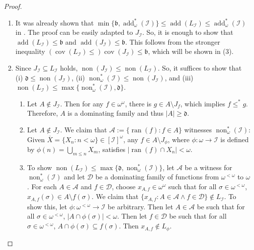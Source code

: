 \documentclass[a4paper,12pt]{amsart}
\theoremstyle{definition}
\numberwithin{thm}{section}
\numberwithin{equation}{section}
\newcommand{\bb}{\mathfrak{b}}
\newcommand{\dd}{\mathfrak{d}}
\DeclareMathOperator{\non}{non}
\DeclareMathOperator{\cov}{cov}
\DeclareMathOperator{\add}{add}
\DeclareMathOperator{\ran}{ran}
\newcommand{\I}{\mathscr{I}}
\renewcommand{\subset}{\subseteq}
\begin{document}
    \begin{proof}
        \begin{enumerate}
        \item It was already shown that $\min\{\bb, \add^*_\omega(\I)\}\leq\add(L_\I)\leq\add^*_\omega(\I)$ in \cite[Proposition 3.6 and Theorem 4.2]{CM25}. The proof can be easily adapted to $J_\I$. So, it is enough to show that $\add(L_\I)\leq\bb$ and $\add(J_\I)\leq\bb$. This follows from the stronger inequality $(\cov(L_\I)\leq)\cov(J_\I)\leq\bb$, which will be shown in (3).
        \item Since $J_\I \subset L_\I$ holds, $\non(J_\I)\leq\non(L_\I)$. So, it suffices to show that (i) $\dd\leq\non(J_\I)$, (ii) $\non^*_\omega(\I)\leq\non(J_\I)$, and (iii) $\non(L_\I)\leq\max\{\non^*_\omega(\I), \dd\}$.
        \begin{enumerate}[label = (\roman*)]
            \item Let $A \notin J_\I$. Then for any $f\in\omega^\omega$, there is $g\in A\setminus J_f$, which implies $f \leq^* g$. Therefore, $A$ is a dominating family and thus $\lvert A\rvert\geq\dd$.
            \item Let $A\notin J_\I$. We claim that $\mathcal{A}:=\{\ran(f):f\in A\}$ witnesses $\non^*_\omega(\I)$: Given $\overline{X} = \{X_n: n<\omega\}\in[\I]^\omega$, any $f\in A\setminus J_\phi$, where $\phi\colon\omega\to\I$ is defined by $\phi(n) = \bigcup_{m\leq n}X_m$, satisfies $\lvert\ran(f)\cap X_n\rvert < \omega$.
            \item To show $\non(L_\I)\leq\max\{\dd, \non^*_\omega(\I)\}$, let $\mathcal{A}$ be a witness for $\non^*_\omega(\I)$ and let $\mathcal{D}$ be a dominating family of functions from $\omega^{<\omega}$ to $\omega$. For each $A\in\mathcal{A}$ and $f\in\mathcal{D}$, choose $x_{A, f}\in\omega^\omega$ such that for all $\sigma\in\omega^{<\omega}$, $x_{A, f}(\sigma)\in A\setminus f(\sigma)$. We claim that $\{x_{A, f}: A\in\mathcal{A}\land f\in\mathcal{D}\}\notin L_\I$. To show this, let $\phi\colon\omega^{<\omega}\to\I$ be arbitrary. Then let $A\in\mathcal{A}$ be such that for all $\sigma\in\omega^{<\omega}$, $\lvert A\cap\phi(\sigma)\rvert<\omega$. Then let $f\in\mathcal{D}$ be such that for all $\sigma\in\omega^{<\omega}$, $A\cap\phi(\sigma)\subset f(\sigma)$. Then $x_{A, f}\notin L_\phi$.
        \end{enumerate}


\end{enumerate}
\end{proof}
\end{document}
